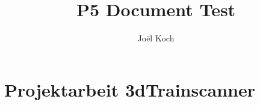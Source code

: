 \documentclass[10pt,a4paper]{article}
\author{Joël Koch}
\title{P5 Document Test}
\begin{document}
	\part{Projektarbeit 3dTrainscanner}
	
\end{document}
